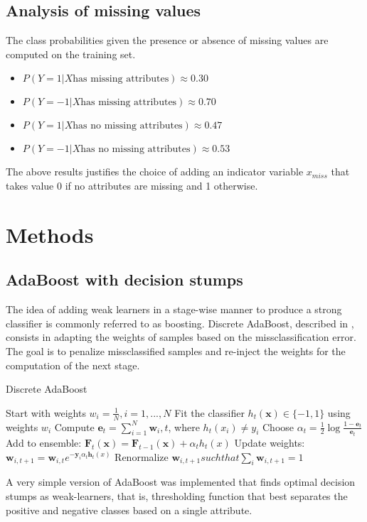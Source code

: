 \documentclass[10pt,conference,compsocconf]{IEEEtran}
\begin{document}
\subsection{Analysis of missing values}
\label{sec:orgheadline7}
The class probabilities given the presence or absence of missing values are computed on the training set. 
\begin{itemize}
\item \(P(Y=1|X \text{has missing attributes}) \approx 0.30\)
\item \(P(Y=-1|X \text{has missing attributes}) \approx 0.70\)
\item \(P(Y=1|X \text{has no missing attributes}) \approx 0.47\)
\item \(P(Y=-1|X \text{has no missing attributes}) \approx 0.53\)
\end{itemize}

The above results justifies the choice of adding an indicator variable \(x_{miss}\) that takes value 0 if no attributes are missing and 1 otherwise.

\section{Methods}
\label{sec:orgheadline10}
\subsection{AdaBoost with decision stumps}
\label{sec:orgheadline9}
The idea of adding weak learners in a stage-wise manner to produce a strong classifier is commonly referred to as boosting. Discrete AdaBoost, described in \cite{friedman98}, consists in adapting the weights of samples based on the missclassification error. The goal is to penalize missclassified samples and re-inject the weights for the computation of the next stage.

\begin{algorithm}
\caption{Discrete AdaBoost}
\label{CHalgorithm}
\begin{algorithmic}[1]
\State Start with weights $w_i = \frac{1}{N}, i=1,...,N$
\State Fit the classifier $h_t(\bm{x}) \in \{-1,1\}$ using weights $w_i$
\State Compute $\bm{e}_t = \sum_{i=1}^N{\bm{w}_i,t}$, where $h_t(x_i) \neq y_i$
\State Choose $\alpha_t = \frac{1}{2} \log{\frac{1-\bm{e}_t}{\bm{e}_t}}$
\State Add to ensemble: $\bm{F}_t(\bm{x}) = \bm{F}_{t-1}(\bm{x}) + \alpha_t h_t(x)$ 
\State Update weights: $\bm{w}_{i,t+1} = \bm{w}_{i,t} e^{-\bm{y}_i \alpha_t \bm{h}_t(x)}$ 
\State Renormalize $\bm{w}_{i,t+1} such that \sum_i{\bm{w}_{i,t+1}} = 1$
\EndFor
\EndProcedure
\end{algorithmic}
\end{algorithm}

A very simple version of AdaBoost was implemented that finds optimal decision stumps as weak-learners, that is, thresholding function that best separates the positive and negative classes based on a single attribute.
\end{document}
